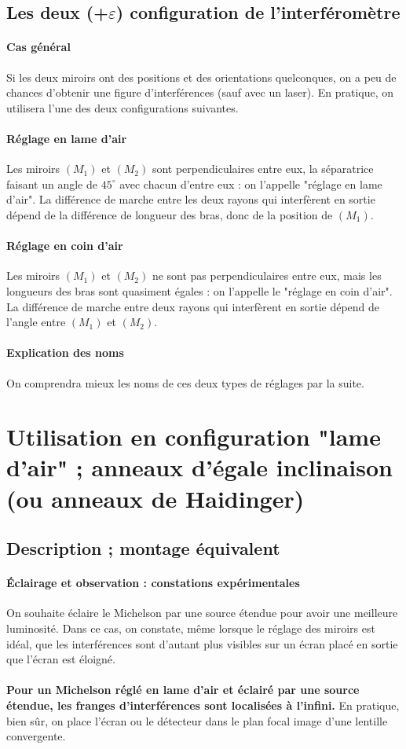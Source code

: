 \documentclass[french]{book}
\theoremstyle{plain}
\theoremstyle{definition}
\theoremstyle{remark}
\begin{document}
\subsection{Les deux (+$\varepsilon$) configuration de l'interféromètre}
\paragraph{Cas général} Si les deux miroirs ont des positions et des orientations quelconques, on a peu de chances d'obtenir une figure d'interférences (sauf avec un laser). En pratique, on utilisera l'une des deux configurations suivantes.
\paragraph{Réglage en lame d'air} Les miroirs $(M_1)$ et $(M_2)$ sont perpendiculaires entre eux, la séparatrice faisant un angle de $45^\circ$ avec chacun d'entre eux : on l'appelle "réglage en lame d'air". La différence de marche entre les deux rayons qui interfèrent en sortie dépend de la différence de longueur des bras, donc de la position de $(M_1)$.
\paragraph{Réglage en coin d'air} Les miroirs $(M_1)$ et $(M_2)$ ne sont pas perpendiculaires entre eux, mais les longueurs des bras sont quasiment égales : on l'appelle le "réglage en coin d'air". La différence de marche entre deux rayons qui interfèrent en sortie dépend de l'angle entre $(M_1)$ et $(M_2)$.
\paragraph{Explication des noms} On comprendra mieux les noms de ces deux types de réglages par la suite.
\section{Utilisation en configuration "lame d'air" ; anneaux d'égale inclinaison (ou anneaux de Haidinger)}
\subsection{Description ; montage équivalent}
\paragraph{Éclairage et observation : constations expérimentales}
On souhaite éclaire le Michelson par une source étendue pour avoir une meilleure luminosité. Dans ce cas, on constate, même lorsque le réglage des miroirs est idéal, que les interférences sont d'autant plus visibles sur un écran placé en sortie que l'écran est éloigné. \\ \\ \textbf{Pour un Michelson réglé en lame d'air et éclairé par une source étendue, les franges d'interférences sont localisées à l'infini.} En pratique, bien sûr, on place l'écran ou le détecteur dans le plan focal image d'une lentille convergente.
\end{document}
